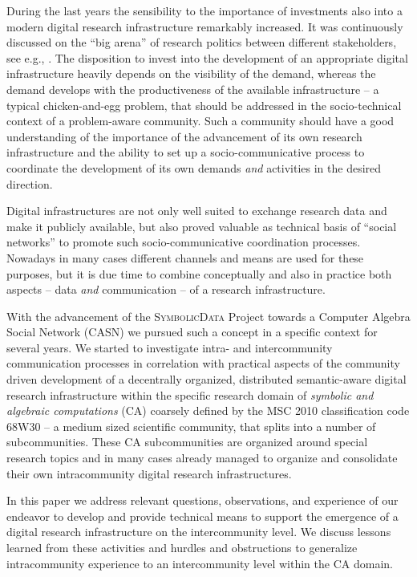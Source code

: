 \documentclass{mathincs}
\newcommand{\SD}{\textsc{Symbo\-lic\-Data}}
\begin{document}
During the last years the sensibility to the importance of investments also
into a modern digital research infrastructure remarkably increased. It was
continuously discussed on the ``big arena'' of research politics between
different stakeholders, see e.g., \cite{h2020,esfri}.  The disposition to
invest into the development of an appropriate digital infrastructure heavily
depends on the visibility of the demand, whereas the demand develops with the
productiveness of the available infrastructure -- a typical chicken-and-egg
problem, that should be addressed in the socio-technical context of a
problem-aware community.  Such a community should have a good understanding of
the importance of the advancement of its own research infrastructure and the
ability to set up a socio-communicative process to coordinate the development
of its own demands \emph{and} activities in the desired direction.

Digital infrastructures are not only well suited to exchange research data and
make it publicly available, but also proved valuable as technical basis of
``social networks'' to promote such socio-communicative coordination processes.
Nowadays in many cases different channels and means are used for these
purposes, but it is due time to combine conceptually and also in practice both
aspects -- data \emph{and} communication -- of a research infrastructure.

With the advancement of the {\SD} Project \cite{sdwiki} towards a Computer
Algebra Social Network (CASN) we pursued such a concept in a specific context
for several years.  We started to investigate intra- and intercommunity
communication processes in correlation with practical aspects of the community
driven development of a decentrally organized, distributed semantic-aware
digital research infrastructure within the specific research domain of
\emph{symbolic and algebraic computations} (CA) coarsely defined by the MSC
2010 classification code 68W30 -- a medium sized scientific community, that
splits into a number of subcommunities.  These CA subcommunities are organized
around special research topics and in many cases already managed to organize
and consolidate their own intracommunity digital research infrastructures.

In this paper we address relevant questions, observations, and experience of
our endeavor to develop and provide technical means to support the emergence of
a digital research infrastructure on the intercommunity level.  We discuss
lessons learned from these activities and hurdles and obstructions to
generalize intracommunity experience to an intercommunity level within the CA
domain.
\end{document}
